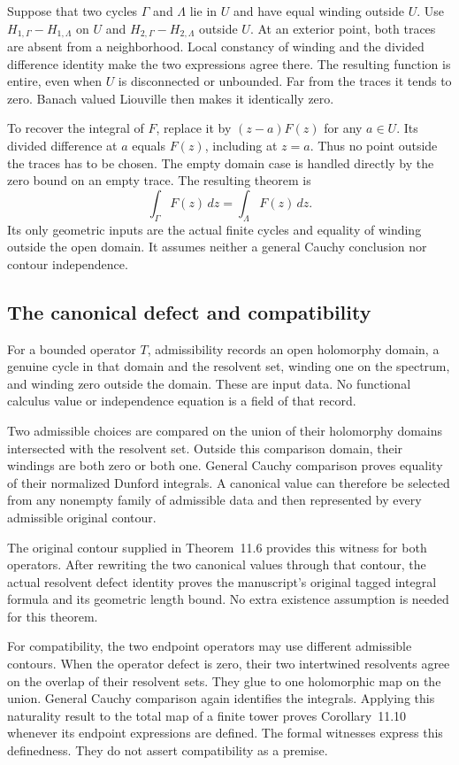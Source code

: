 Suppose that two cycles $\Gamma$ and $\Lambda$ lie in $U$ and have equal winding outside $U$. Use $H_{1,\Gamma}-H_{1,\Lambda}$ on $U$ and $H_{2,\Gamma}-H_{2,\Lambda}$ outside $U$. At an exterior point, both traces are absent from a neighborhood. Local constancy of winding and the divided difference identity make the two expressions agree there. The resulting function is entire, even when $U$ is disconnected or unbounded. Far from the traces it tends to zero. Banach valued Liouville then makes it identically zero.

To recover the integral of $F$, replace it by $(z-a)F(z)$ for any $a\in U$. Its divided difference at $a$ equals $F(z)$, including at $z=a$. Thus no point outside the traces has to be chosen. The empty domain case is handled directly by the zero bound on an empty trace. The resulting theorem is
\[
 \int_\Gamma F(z)\,dz=\int_\Lambda F(z)\,dz.
\]
Its only geometric inputs are the actual finite cycles and equality of winding outside the open domain. It assumes neither a general Cauchy conclusion nor contour independence.

\subsection{The canonical defect and compatibility}

For a bounded operator $T$, admissibility records an open holomorphy domain, a genuine cycle in that domain and the resolvent set, winding one on the spectrum, and winding zero outside the domain. These are input data. No functional calculus value or independence equation is a field of that record.

Two admissible choices are compared on the union of their holomorphy domains intersected with the resolvent set. Outside this comparison domain, their windings are both zero or both one. General Cauchy comparison proves equality of their normalized Dunford integrals. A canonical value can therefore be selected from any nonempty family of admissible data and then represented by every admissible original contour.

The original contour supplied in Theorem~11.6 provides this witness for both operators. After rewriting the two canonical values through that contour, the actual resolvent defect identity proves the manuscript's original tagged integral formula and its geometric length bound. No extra existence assumption is needed for this theorem.

For compatibility, the two endpoint operators may use different admissible contours. When the operator defect is zero, their two intertwined resolvents agree on the overlap of their resolvent sets. They glue to one holomorphic map on the union. General Cauchy comparison again identifies the integrals. Applying this naturality result to the total map of a finite tower proves Corollary~11.10 whenever its endpoint expressions are defined. The formal witnesses express this definedness. They do not assert compatibility as a premise.

